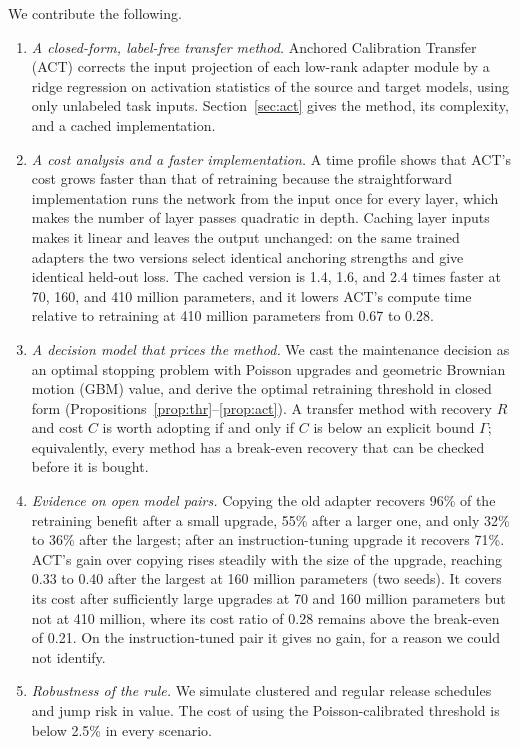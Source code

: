 \documentclass[ijoc,nonblindrev]{informs4}
\begin{document}
We contribute the following.
\begin{enumerate}
\item \emph{A closed-form, label-free transfer method.} Anchored Calibration Transfer (ACT) corrects the input projection of each low-rank adapter module by a ridge regression on activation statistics of the source and target models, using only unlabeled task inputs. Section~\ref{sec:act} gives the method, its complexity, and a cached implementation.
\item \emph{A cost analysis and a faster implementation.} A time profile shows that ACT's cost grows faster than that of retraining because the straightforward implementation runs the network from the input once for every layer, which makes the number of layer passes quadratic in depth. Caching layer inputs makes it linear and leaves the output unchanged: on the same trained adapters the two versions select identical anchoring strengths and give identical held-out loss. The cached version is 1.4, 1.6, and 2.4 times faster at 70, 160, and 410 million parameters, and it lowers ACT's compute time relative to retraining at 410 million parameters from 0.67 to 0.28.
\item \emph{A decision model that prices the method.} We cast the maintenance decision as an optimal stopping problem with Poisson upgrades and geometric Brownian motion (GBM) value, and derive the optimal retraining threshold in closed form (Propositions~\ref{prop:thr}--\ref{prop:act}). A transfer method with recovery $R$ and cost $C$ is worth adopting if and only if $C$ is below an explicit bound $\Gamma$; equivalently, every method has a break-even recovery that can be checked before it is bought.
\item \emph{Evidence on open model pairs.} Copying the old adapter recovers 96\% of the retraining benefit after a small upgrade, 55\% after a larger one, and only 32\% to 36\% after the largest; after an instruction-tuning upgrade it recovers 71\%. ACT's gain over copying rises steadily with the size of the upgrade, reaching 0.33 to 0.40 after the largest at 160 million parameters (two seeds). It covers its cost after sufficiently large upgrades at 70 and 160 million parameters but not at 410 million, where its cost ratio of 0.28 remains above the break-even of 0.21. On the instruction-tuned pair it gives no gain, for a reason we could not identify.
\item \emph{Robustness of the rule.} We simulate clustered and regular release schedules and jump risk in value. The cost of using the Poisson-calibrated threshold is below 2.5\% in every scenario.
\end{enumerate}
\end{document}
